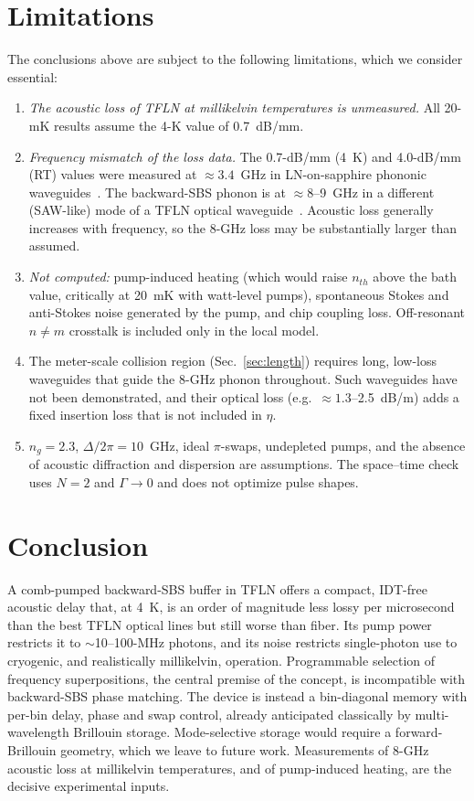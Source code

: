\documentclass[reprint,amsmath,amssymb,aps,prapplied,superscriptaddress,floatfix]{revtex4-2}
\begin{document}
\section{Limitations}\label{sec:limits}
The conclusions above are subject to the following limitations, which we consider essential:
\begin{enumerate}
\item \emph{The acoustic loss of TFLN at millikelvin temperatures is unmeasured.} All 20-mK results assume the 4-K value of 0.7~dB/mm.
\item \emph{Frequency mismatch of the loss data.} The 0.7-dB/mm (4~K) and 4.0-dB/mm (RT) values were measured at $\approx3.4$~GHz in LN-on-sapphire phononic waveguides~\cite{Mayor2021}. The backward-SBS phonon is at $\approx8$--9~GHz in a different (SAW-like) mode of a TFLN optical waveguide~\cite{Ye2023SAW}. Acoustic loss generally increases with frequency, so the 8-GHz loss may be substantially larger than assumed.
\item \emph{Not computed:} pump-induced heating (which would raise $n_{th}$ above the bath value, critically at 20~mK with watt-level pumps), spontaneous Stokes and anti-Stokes noise generated by the pump, and chip coupling loss. Off-resonant $n\neq m$ crosstalk is included only in the local model.
\item The meter-scale collision region (Sec.~\ref{sec:length}) requires long, low-loss waveguides that guide the 8-GHz phonon throughout. Such waveguides have not been demonstrated, and their optical loss (e.g.\ $\approx1.3$--2.5~dB/m) adds a fixed insertion loss that is not included in $\eta$.
\item $n_g=2.3$, $\Delta/2\pi=10$~GHz, ideal $\pi$-swaps, undepleted pumps, and the absence of acoustic diffraction and dispersion are assumptions. The space--time check uses $N=2$ and $\Gamma\to0$ and does not optimize pulse shapes.
\end{enumerate}

\section{Conclusion}
A comb-pumped backward-SBS buffer in TFLN offers a compact, IDT-free acoustic delay that, at 4~K, is an order of magnitude less lossy per microsecond than the best TFLN optical lines but still worse than fiber. Its pump power restricts it to $\sim$10--100-MHz photons, and its noise restricts single-photon use to cryogenic, and realistically millikelvin, operation. Programmable selection of frequency superpositions, the central premise of the concept, is incompatible with backward-SBS phase matching. The device is instead a bin-diagonal memory with per-bin delay, phase and swap control, already anticipated classically by multi-wavelength Brillouin storage. Mode-selective storage would require a forward-Brillouin geometry, which we leave to future work. Measurements of 8-GHz acoustic loss at millikelvin temperatures, and of pump-induced heating, are the decisive experimental inputs.
\end{document}
